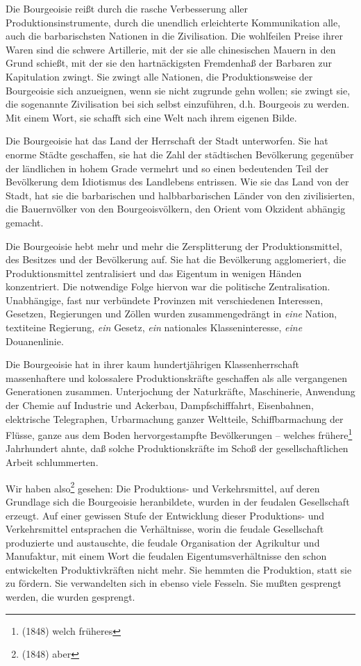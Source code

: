 \documentclass[letterpaper]{article}
\begin{document}
Die Bourgeoisie reißt durch die rasche Verbesserung aller Produktionsinstrumente, durch die unendlich erleichterte Kommunikation alle, auch die barbarischsten Nationen in die Zivilisation. Die wohlfeilen Preise ihrer Waren sind die schwere Artillerie, mit der sie alle chinesischen Mauern in den Grund schießt, mit der sie den hartnäckigsten Fremdenhaß der Barbaren zur Kapitulation zwingt. Sie zwingt alle Nationen, die Produktionsweise der Bourgeoisie sich anzueignen, wenn sie nicht zugrunde gehn wollen; sie zwingt sie, die sogenannte Zivilisation bei sich selbst einzuführen, d.h. Bourgeois zu werden. Mit einem Wort, sie schafft sich eine Welt nach ihrem eigenen Bilde.

Die Bourgeoisie hat das Land der Herrschaft der Stadt unterworfen. Sie hat enorme Städte geschaffen, sie hat die Zahl der städtischen Bevölkerung gegenüber der ländlichen in hohem Grade vermehrt und so einen bedeutenden Teil der Bevölkerung dem Idiotismus des Landlebens entrissen. Wie sie das Land von der Stadt, hat sie die barbarischen und halbbarbarischen Länder von den zivilisierten, die Bauernvölker von den Bourgeoisvölkern, den Orient vom Okzident abhängig gemacht.

Die Bourgeoisie hebt mehr und mehr die Zersplitterung der Produktionsmittel, des Besitzes und der Bevölkerung auf. Sie hat die Bevölkerung agglomeriert, die Produktionsmittel zentralisiert und das Eigentum in wenigen Händen konzentriert. Die notwendige Folge hiervon war die politische Zentralisation. Unabhängige, fast nur verbündete Provinzen mit verschiedenen Interessen, Gesetzen, Regierungen und Zöllen wurden zusammengedrängt in \textit{eine} Nation, textit{eine} Regierung, \textit{ein} Gesetz, \textit{ein} nationales Klasseninteresse, \textit{eine} Douanenlinie.

Die Bourgeoisie hat in ihrer kaum hundertjährigen Klassenherrschaft massenhaftere und kolossalere Produktionskräfte geschaffen als alle vergangenen Generationen zusammen. Unterjochung der Naturkräfte, Maschinerie, Anwendung der Chemie auf Industrie und Ackerbau, Dampfschifffahrt, Eisenbahnen, elektrische Telegraphen, Urbarmachung ganzer Weltteile, Schiffbarmachung der Flüsse, ganze aus dem Boden hervorgestampfte Bevölkerungen – welches frühere\footnote{(1848) welch früheres} Jahrhundert ahnte, daß solche Produktionskräfte im Schoß der gesellschaftlichen Arbeit schlummerten.

Wir haben also\footnote{(1848) aber} gesehen: Die Produktions- und Verkehrsmittel, auf deren Grundlage sich die Bourgeoisie heranbildete, wurden in der feudalen Gesellschaft erzeugt. Auf einer gewissen Stufe der Entwicklung dieser Produktions- und Verkehrsmittel entsprachen die Verhältnisse, worin die feudale Gesellschaft produzierte und austauschte, die feudale Organisation der Agrikultur und Manufaktur, mit einem Wort die feudalen Eigentumsverhältnisse den schon entwickelten Produktivkräften nicht mehr. Sie hemmten die Produktion, statt sie zu fördern. Sie verwandelten sich in ebenso viele Fesseln. Sie mußten gesprengt werden, die wurden gesprengt.
\end{document}
